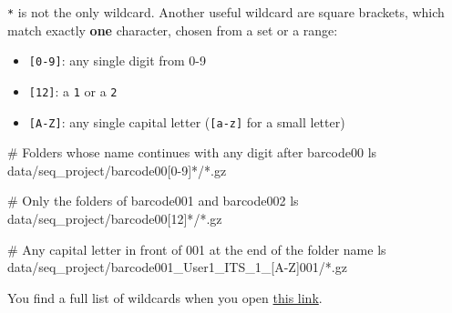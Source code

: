 \documentclass[
  letterpaper,
  DIV=11,
  numbers=noendperiod]{scrreprt}
\newenvironment{Shaded}{}{}
\newcommand{\CommentTok}[1]{\textcolor[rgb]{0.42,0.45,0.49}{#1}}
\newcommand{\FunctionTok}[1]{\textcolor[rgb]{0.44,0.26,0.76}{#1}}
\newcommand{\NormalTok}[1]{\textcolor[rgb]{0.14,0.16,0.18}{#1}}
\newcommand{\PreprocessorTok}[1]{\textcolor[rgb]{0.84,0.23,0.29}{#1}}
\newcommand{\SpecialStringTok}[1]{\textcolor[rgb]{0.01,0.18,0.38}{#1}}
\providecommand{\tightlist}{%
  \setlength{\itemsep}{0pt}\setlength{\parskip}{0pt}}
\begin{document}
\begin{tcolorbox}[enhanced jigsaw, coltitle=black, breakable, titlerule=0mm, colback=white, rightrule=.15mm, bottomrule=.15mm, toprule=.15mm, colframe=quarto-callout-tip-color-frame, colbacktitle=quarto-callout-tip-color!10!white, bottomtitle=1mm, opacitybacktitle=0.6, toptitle=1mm, leftrule=.75mm, arc=.35mm, title=\textcolor{quarto-callout-tip-color}{\faLightbulb}\hspace{0.5em}{Tip: More wildcards (optional)}, left=2mm, opacityback=0]

\texttt{*} is not the only wildcard. Another useful wildcard are square
brackets, which match exactly \textbf{one} character, chosen from a set
or a range:

\begin{itemize}
\tightlist
\item
  \texttt{{[}0-9{]}}: any single digit from 0-9
\item
  \texttt{{[}12{]}}: a \texttt{1} or a \texttt{2}
\item
  \texttt{{[}A-Z{]}}: any single capital letter (\texttt{{[}a-z{]}} for
  a small letter)
\end{itemize}

\begin{Shaded}
\begin{Highlighting}[]
\CommentTok{\# Folders whose name continues with any digit after barcode00}
\FunctionTok{ls}\NormalTok{ data/seq\_project/barcode00}\PreprocessorTok{[}\SpecialStringTok{0}\PreprocessorTok{{-}}\SpecialStringTok{9}\PreprocessorTok{]*}\NormalTok{/}\PreprocessorTok{*}\NormalTok{.gz}

\CommentTok{\# Only the folders of barcode001 and barcode002}
\FunctionTok{ls}\NormalTok{ data/seq\_project/barcode00}\PreprocessorTok{[}\SpecialStringTok{12}\PreprocessorTok{]*}\NormalTok{/}\PreprocessorTok{*}\NormalTok{.gz}

\CommentTok{\# Any capital letter in front of 001 at the end of the folder name}
\FunctionTok{ls}\NormalTok{ data/seq\_project/barcode001\_User1\_ITS\_1\_}\PreprocessorTok{[}\SpecialStringTok{A}\PreprocessorTok{{-}}\SpecialStringTok{Z}\PreprocessorTok{]}\NormalTok{001/}\PreprocessorTok{*}\NormalTok{.gz}
\end{Highlighting}
\end{Shaded}

You find a full list of wildcards when you open
\href{https://tldp.org/LDP/GNU-Linux-Tools-Summary/html/x11655.htm}{this
link}.

\end{tcolorbox}
\end{document}
